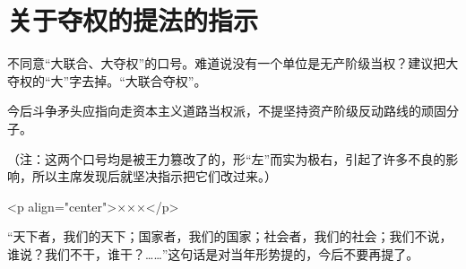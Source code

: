 \section[关于夺权的提法的指示（一九六七年二月二十七日）]{关于夺权的提法的指示}


不同意“大联合、大夺权”的口号。难道说没有一个单位是无产阶级当权？建议把大夺权的“大”字去掉。“大联合夺权”。

今后斗争矛头应指向走资本主义道路当权派，不提坚持资产阶级反动路线的顽固分子。

（注：这两个口号均是被王力篡改了的，形“左”而实为极右，引起了许多不良的影响，所以主席发现后就坚决指示把它们改过来。）

<p align="center">×××</p>

“天下者，我们的天下；国家者，我们的国家；社会者，我们的社会；我们不说，谁说？我们不干，谁干？……”这句话是对当年形势提的，今后不要再提了。



